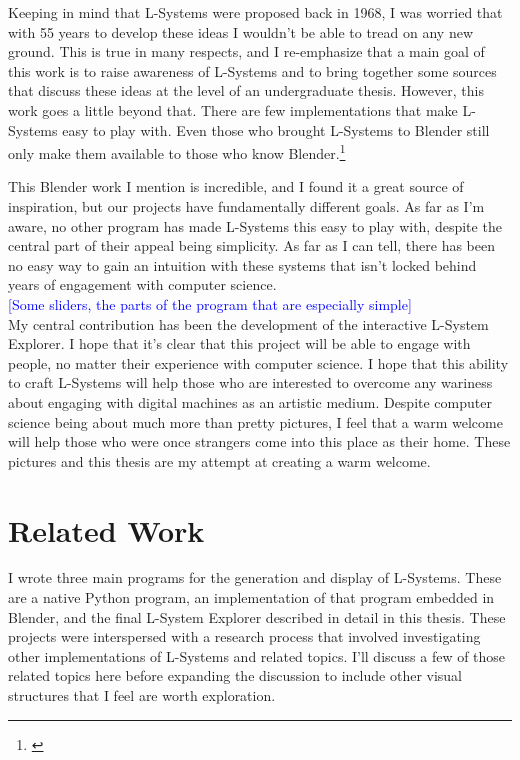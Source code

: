 \documentclass[12pt,twoside]{reedthesis}
\begin{document}
	Keeping in mind that L-Systems were proposed back in 1968, I was worried that with 55 years to develop these ideas I wouldn't be able to tread on any new ground. This is true in many respects, and I re-emphasize that a main goal of this work is to raise awareness of L-Systems and to bring together some sources that discuss these ideas at the level of an undergraduate thesis. However, this work goes a little beyond that. There are few implementations that make L-Systems easy to play with. Even those who brought L-Systems to Blender still only make them available to those who know Blender.\footnote{\cite{Leopold2017}}
	
	This Blender work I mention is incredible, and I found it a great source of inspiration, but our projects have fundamentally different goals. As far as I'm aware, no other program has made L-Systems this easy to play with, despite the central part of their appeal being simplicity. As far as I can tell, there has been no easy way to gain an intuition with these systems that isn't locked behind years of engagement with computer science.\\
	
	\textcolor{blue}{[Some sliders, the parts of the program that are especially simple]}\\
	
	My central contribution has been the development of the interactive L-System Explorer. I hope that it's clear that this project will be able to engage with people, no matter their experience with computer science. I hope that this ability to craft L-Systems will help those who are interested to overcome any wariness about engaging with digital machines as an artistic medium. Despite computer science being about much more than pretty pictures, I feel that a warm welcome will help those who were once strangers come into this place as their home. These pictures and this thesis are my attempt at creating a warm welcome.

\section{Related Work}
	I wrote three main programs for the generation and display of L-Systems. These are a native Python program, an implementation of that program embedded in Blender, and the final L-System Explorer described in detail in this thesis. These projects were interspersed with a research process that involved investigating other implementations of L-Systems and related topics. I'll discuss a few of those related topics here before expanding the discussion to include other visual structures that I feel are worth exploration.\\
	
\end{document}
